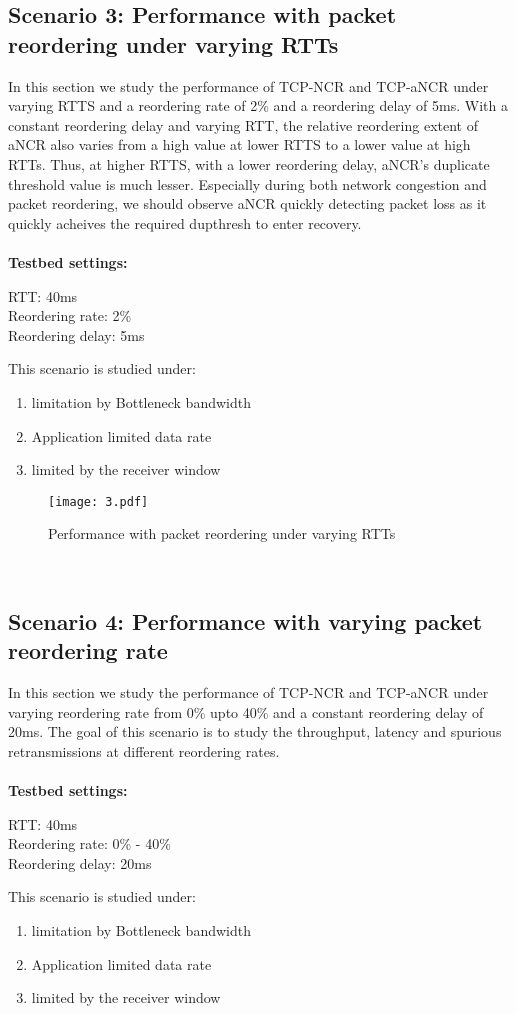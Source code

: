 \subsection{Scenario 3: Performance with packet reordering under varying RTTs\label{ss:is3}}
In this section we study the performance of TCP-NCR and TCP-aNCR under varying RTTS and a reordering rate of 2\% and a reordering delay of 5ms. With a constant reordering delay and varying RTT, the relative reordering extent of aNCR also varies from a high value at lower RTTS to a lower value at high RTTs.
Thus, at higher RTTS, with a lower reordering delay, aNCR's duplicate threshold value is much lesser. Especially during both network congestion and packet reordering, we should observe aNCR quickly detecting packet loss as it quickly acheives the required dupthresh to enter recovery.
\\
\\
\textbf{Testbed settings:}
\begin{tabbing}
\enspace RTT: 40ms \\
\enspace Reordering rate: 2\% \\
\enspace Reordering delay: 5ms
\end{tabbing}
This scenario is studied under:
\begin{enumerate}
    \item limitation by Bottleneck bandwidth
    \item Application limited data rate
    \item limited by the receiver window
\end{enumerate}

\begin{figure}
    \centering
    \texttt{[image: 3.pdf]}\\
    \caption{Performance with packet reordering under varying RTTs}\label{fig:3_i}
\end{figure}

\
\subsection{Scenario 4: Performance with varying packet reordering rate\label{ss:is4}}
In this section we study the performance of TCP-NCR and TCP-aNCR under varying reordering rate from 0\% upto 40\% and a constant reordering delay of 20ms. The goal of this scenario is to study the throughput, latency and spurious retransmissions at different reordering rates.
\\
\\
\textbf{Testbed settings:}
\begin{tabbing}
\enspace RTT: 40ms \\
\enspace Reordering rate: 0\% - 40\% \\
\enspace Reordering delay: 20ms
\end{tabbing}
This scenario is studied under:
\begin{enumerate}
    \item limitation by Bottleneck bandwidth
    \item Application limited data rate
    \item limited by the receiver window
\end{enumerate}

